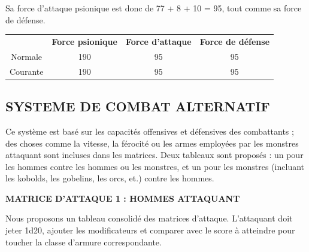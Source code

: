 \documentclass[11pt]{article}
\begin{document}
{\bigskip

Sa force d'attaque psionique est donc de 77 + 8 + 10 = 95, tout comme sa force de défense.

\bigskip

\begin{tabular}{cccc}
& \textbf{Force psionique} & \textbf{Force d'attaque} & \textbf{Force de défense}  \\
Normale     & 190 & 95 & 95 \\
Courante    & 190 & 95 & 95 \\
\end{tabular}

\newpage
\subsection*{SYSTEME DE COMBAT ALTERNATIF}
\label{custom-combat-alternatif}

Ce système est basé sur les capacités offensives et défensives des combattants ; des choses comme la vitesse, la férocité ou les armes employées par les monstres attaquant sont incluses dans les matrices. Deux tableaux sont proposés : un pour les hommes contre les hommes ou les monstres, et un pour les monstres (incluant les kobolds, les gobelins, les orcs, et.) contre les hommes.

\bigskip

\textbf{MATRICE D'ATTAQUE 1 : HOMMES ATTAQUANT}

\bigskip

Nous proposons un tableau consolidé des matrices d'attaque. L'attaquant doit jeter 1d20, ajouter les modificateurs et comparer avec le score à atteindre pour toucher la classe d'armure correspondante.

\bigskip

}
\end{document}
